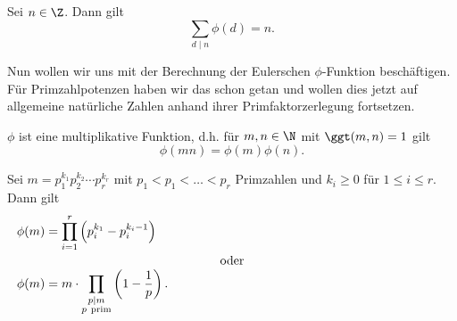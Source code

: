 \begin{thm}\autolabel
	Sei $n \in \Z$. Dann gilt
	\[ \sum_{d \mid n} \phi(d) = n. \]
\end{thm}

Nun wollen wir uns mit der Berechnung der Eulerschen $\phi$-Funktion beschäftigen. Für Primzahlpotenzen haben wir das schon getan und wollen dies jetzt auf allgemeine natürliche Zahlen anhand ihrer Primfaktorzerlegung fortsetzen.

\begin{thm}\autolabel\video
	$\phi$ ist eine multiplikative Funktion, d.h. für $m,n \in \N$ mit $\ggt(m,n) = 1$ gilt $$\phi(mn) = \phi(m)\phi(n).$$
\end{thm}

\begin{cor}
	Sei $m = p_1^{k_1} p_2^{k_2} \dotsm p_r^{k_r}$ mit $p_1 < p_1 < \dots < p_r$ Primzahlen und $k_i \geq 0$ für $1 \leq i \leq r$. Dann gilt
	\begin{align*}
		\phi(m) &= \prod_{i=1}^r \left( p_i^{k_1} - p_i^{k_i-1} \right)\\
		\noalign{\centering oder}
		\phi(m) &= m \cdot \prod_{\substack{p \mid  m \\ p \ \text{prim}}} \left( 1-\frac{1}{p} \right).
	\end{align*}
\end{cor}